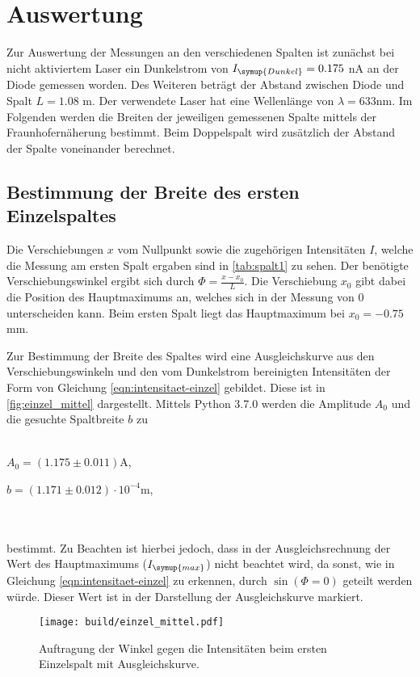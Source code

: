 \section{Auswertung}
\label{sec:Auswertung}
Zur Auswertung der Messungen an den verschiedenen Spalten ist zunächst bei nicht aktiviertem Laser ein Dunkelstrom von
$I_{\symup{Dunkel}} = 0.175$ nA an der Diode gemessen worden.
Des Weiteren beträgt der Abstand zwischen Diode und Spalt $L = 1.08$ m. Der verwendete Laser hat eine Wellenlänge von $\lambda = 633$nm.
Im Folgenden werden die Breiten der jeweiligen gemessenen Spalte mittels der Fraunhofernäherung bestimmt. Beim Doppelspalt wird zusätzlich
der Abstand der Spalte voneinander berechnet.
\subsection{Bestimmung der Breite des ersten Einzelspaltes}
    Die Verschiebungen $x$ vom Nullpunkt sowie die zugehörigen Intensitäten $I$, welche die Messung am ersten Spalt ergaben sind in \autoref{tab:spalt1}
    zu sehen. Der benötigte Verschiebungswinkel ergibt sich durch $\Phi = \frac{x -x_0}{L}$. Die Verschiebung $x_0$ gibt dabei die 
    Position des Hauptmaximums an, welches sich in der Messung von $0$ unterscheiden kann. Beim ersten Spalt liegt das Hauptmaximum bei 
    $x_0 = - 0.75$ mm.
    
    Zur Bestimmung der Breite des Spaltes wird eine Ausgleichskurve aus den Verschiebungswinkeln und den vom Dunkelstrom bereinigten
    Intensitäten der Form von Gleichung \eqref{eqn:intensitaet-einzel} gebildet. 
    Diese ist in \autoref{fig:einzel_mittel} dargestellt. Mittels Python 3.7.0 werden die Amplitude $A_0$ und die gesuchte Spaltbreite $b$ zu 
    \\ \\ 
    \centerline{$A_0 = (1.175 \pm 0.011) $A,}
    \centerline{$b = (1.171 \pm 0.012) \cdot 10^{-4}$m,}
    \\ \\
    bestimmt. Zu Beachten ist hierbei jedoch, dass in der Ausgleichsrechnung der Wert des Hauptmaximums ($I_{\symup{max}}$)
    nicht beachtet wird, da sonst, wie in Gleichung 
    \eqref{eqn:intensitaet-einzel} zu erkennen, durch $\sin(\Phi = 0)$ geteilt werden würde.
    Dieser Wert ist in der Darstellung der Ausgleichskurve markiert.
    \begin{figure}
        \centering
        \texttt{[image: build/einzel\_mittel.pdf]}
        \caption{Auftragung der Winkel gegen die Intensitäten beim ersten Einzelspalt mit Ausgleichskurve.}
        \label{fig:einzel_mittel}
    \end{figure}
